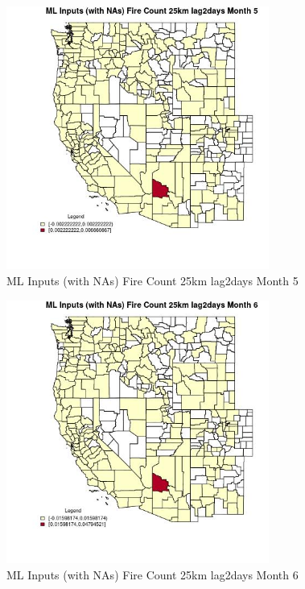 \clearpage 

\begin{figure} 
\centering  
\includegraphics[width=0.77\textwidth]{Code_Outputs/Report_ML_input_PM25_Step4_part_e_de_duplicated_aves_compiled_2019-05-21wNAs_CountyFire_Count_25km_lag2daysmedianMonth5.jpg} 
\caption{\label{fig:Report_ML_input_PM25_Step4_part_e_de_duplicated_aves_compiled_2019-05-21wNAsCountyFire_Count_25km_lag2daysmedianMonth5}ML Inputs (with NAs) Fire Count 25km lag2days Month 5} 
\end{figure} 
 

\begin{figure} 
\centering  
\includegraphics[width=0.77\textwidth]{Code_Outputs/Report_ML_input_PM25_Step4_part_e_de_duplicated_aves_compiled_2019-05-21wNAs_CountyFire_Count_25km_lag2daysmedianMonth6.jpg} 
\caption{\label{fig:Report_ML_input_PM25_Step4_part_e_de_duplicated_aves_compiled_2019-05-21wNAsCountyFire_Count_25km_lag2daysmedianMonth6}ML Inputs (with NAs) Fire Count 25km lag2days Month 6} 
\end{figure} 
 

